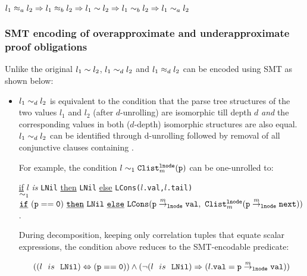 \begin{center}
$l_1\approx_al_2 \Rightarrow l_1\approx_bl_2 \Rightarrow l_1\sim{}l_2 \Rightarrow l_1\sim_bl_2 \Rightarrow l_1\sim_al_2$
\end{center}


\subsubsection{SMT encoding of overapproximate and underapproximate proof obligations}
\label{sec:ouapprox}
Unlike the original \recursiveRelation{} $l_1\sim{}l_2$,
$l_1\sim_dl_2$ and
$l_1\approx_dl_2$ can be encoded using SMT as shown below:
\begin{itemize}
\item $l_1\sim_dl_2$ is equivalent to the condition
that the parse tree structures
of the two values $l_1$ and $l_2$ (after $d$-unrolling)
are isomorphic till depth $d$ {\em and} the
corresponding values in both ($d$-depth)
isomorphic structures
are also equal.
$l_1\sim_dl_2$ can be identified through d-unrolling followed by removal of all conjunctive clauses containing \recursiveRelations{}.

For example, the condition $l\sim_1{\tt Clist}^{{\tt lnode}}_{m}({\tt p})$
can be one-unrolled to:
\begin{small}
\begin{center}
\underline{if} $l$ {\em is} {\tt LNil} \underline{then} {\tt LNil} \underline{else} {\tt LCons($l$.val,$l$.tail)}\\
$\sim_1$\\
$\mathrm{\tt \underline{if}\ (p==0)\ \underline{then}\ }{\tt LNil}\mathrm{\tt \ \underline{else}\ {\tt LCons}(}\structPointer{p}{m}{{\tt lnode}}{val},\ {\tt Clist}^{{\tt lnode}}_m(\structPointer{p}{m}{{\tt lnode}}{next}))$.
\end{center}
\end{small}
During decomposition, keeping only correlation tuples that equate scalar expressions,
the condition above
reduces to the SMT-encodable predicate:
\begin{small}
$$
((l\ \ is\ \ {\tt LNil}) \Leftrightarrow {\tt (p == 0)}) \land (\neg(l\ \ is\ \ {\tt LNil})\Rightarrow(l{\tt.val}={\tt p} \overset{m}{\rightarrow}_{{\tt lnode}} {\tt val}))
$$
\end{small}



\end{itemize}
